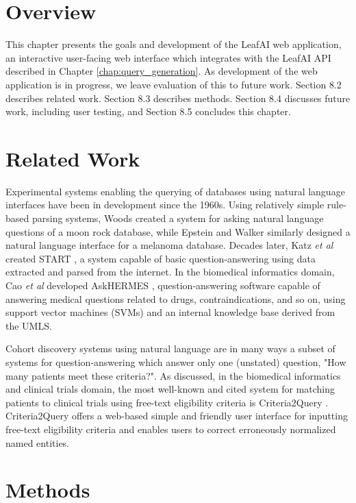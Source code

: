 \documentclass[../main.tex]{subfiles}
\begin{document}
\section{Overview}

This chapter presents the goals and development of the LeafAI web application, an interactive user-facing web interface which integrates with the LeafAI API described in Chapter \ref{chap:query_generation}. As development of the web application is in progress, we leave evaluation of this to future work. Section 8.2 describes related work. Section 8.3 describes methods. Section 8.4 discusses future work, including user testing, and Section 8.5 concludes this chapter. 

\section{Related Work}

Experimental systems enabling the querying of databases using natural language interfaces have been in development since the 1960s. Using relatively simple rule-based parsing systems, Woods \cite{woods1973progress} created a system for asking natural language questions of a moon rock database, while Epstein and Walker \cite{epstein1978natural} similarly designed a natural language interface for a melanoma database. Decades later, Katz \textit{et al} created START \cite{katz1999integrating}, a system capable of basic question-answering using data extracted and parsed from the internet. In the biomedical informatics domain, Cao \textit{et al} developed AskHERMES \cite{cao2011askhermes}, question-answering software capable of answering medical questions related to drugs, contraindications, and so on, using support vector machines (SVMs) and an internal knowledge base derived from the UMLS.

Cohort discovery systems using natural language are in many ways a subset of systems for question-answering which answer only one (unstated) question, "How many patients meet these criteria?". As discussed, in the biomedical informatics and clinical trials domain, the most well-known and cited system for matching patients to clinical trials using free-text eligibility criteria is Criteria2Query \cite{yuan2019criteria2query, fang2022combining}. Criteria2Query offers a web-based simple and friendly user interface for inputting free-text eligibility criteria and enables users to correct erroneously normalized named entities.

\section{Methods}
\end{document}
